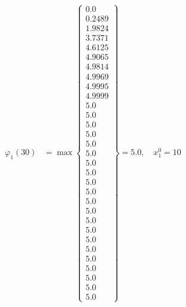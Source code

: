 \documentclass{article}
\begin{document}
\begin{align*}
\varphi_{1}(30) &= \max \left\{ \begin{array}{c}
0.0 \\
 0.2489 \\
 1.9824 \\
 3.7371 \\
 4.6125 \\
 4.9065 \\
 4.9814 \\
 4.9969 \\
 4.9995 \\
 4.9999 \\
 5.0 \\
 5.0 \\
 5.0 \\
 5.0 \\
 5.0 \\
 5.0 \\
 5.0 \\
 5.0 \\
 5.0 \\
 5.0 \\
 5.0 \\
 5.0 \\
 5.0 \\
 5.0 \\
 5.0 \\
 5.0 \\
 5.0 \\
 5.0 \\
 5.0 \\
 5.0 \\
 5.0
\end{array} \right\}=5.0, \quad x_{1}^0=10\\
  

\end{align*}
\end{document}

